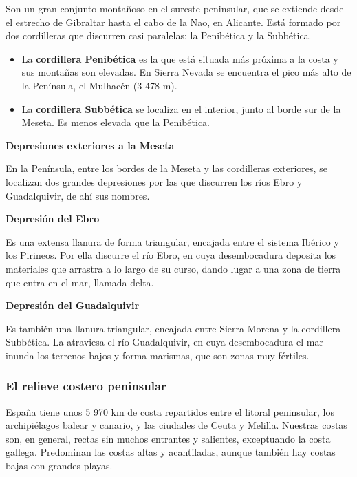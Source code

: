 \vspace{3mm}
Son un gran conjunto montañoso en el sureste peninsular, que se extiende desde el estrecho de Gibraltar hasta el cabo de la Nao, en Alicante. Está formado por dos cordilleras que discurren casi paralelas: la Penibética y la Subbética.

\begin{itemize}
    \item La \textbf{cordillera Penibética} es la que está situada más próxima a la costa y sus montañas son elevadas. En Sierra Nevada se encuentra el pico más alto de la Península, el Mulhacén (3 478 m).
    \item La \textbf{cordillera Subbética} se localiza en el interior, junto al borde sur de la Meseta. Es menos elevada que la Penibética.
\end{itemize}

\textbf{Depresiones exteriores a la Meseta}

\vspace{3mm}
En la Península, entre los bordes de la Meseta y las cordilleras exteriores, se localizan dos grandes depresiones por las que discurren los ríos Ebro y Guadalquivir, de ahí sus nombres.

\vspace{3mm}
\textbf{Depresión del Ebro}

\vspace{3mm}
Es una extensa llanura de forma triangular, encajada entre el sistema Ibérico y los Pirineos. Por ella discurre el río Ebro, en cuya desembocadura deposita los materiales que arrastra a lo largo de su curso, dando lugar a una zona de tierra que entra en el mar, llamada delta.

\vspace{3mm}
\textbf{Depresión del Guadalquivir}

\vspace{3mm}
Es también una llanura triangular, encajada entre Sierra Morena y la cordillera Subbética. La atraviesa el río Guadalquivir, en cuya desembocadura el mar inunda los terrenos bajos y forma marismas, que son zonas muy fértiles.

\subsubsection{El relieve costero peninsular}

España tiene unos 5 970 km de costa repartidos entre el litoral peninsular, los archipiélagos balear y canario, y las ciudades de Ceuta y Melilla. Nuestras costas son, en general, rectas sin muchos entrantes y salientes, exceptuando la costa gallega. Predominan las costas altas y acantiladas, aunque también hay costas bajas con grandes playas.

